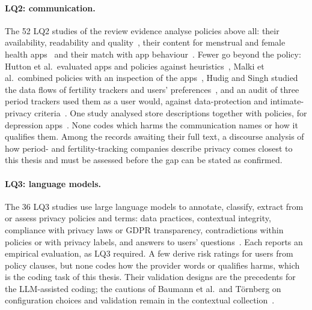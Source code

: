\paragraph{LQ2: communication.} The 52 LQ2 studies of the review evidence
analyse policies above all: their availability, readability and
quality~\parencite{sunyaev2015availability,robillard2019availability,oloughlin2019reviewing},
their content for menstrual and female health apps~\parencite{shipp2020period,malki2024exploring}
and their match with app behaviour~\parencite{huckvale2019assessment,tangari2021mobile}.
Fewer go beyond the policy: Hutton et al.\ evaluated apps and policies against
heuristics~\parencite{hutton2018assessing}, Malki et al.\ combined policies
with an inspection of the apps~\parencite{malki2024exploring}, Hudig and
Singh studied the data flows of fertility trackers and users'
preferences~\parencite{hudig2025intimate}, and an audit of three period trackers
used them as a user would, against data-protection and intimate-privacy
criteria~\parencite{white2026experiential}. One study analysed store
descriptions together with policies, for depression
apps~\parencite{singh2023assessment}. None codes which harms the communication
names or how it qualifies them. Among the records awaiting their full text, a
discourse analysis of how period- and fertility-tracking companies describe
privacy comes closest to this thesis and must be assessed before the gap can be
stated as confirmed.

\paragraph{LQ3: language models.} The 36 LQ3 studies use large language models
to annotate, classify, extract from or assess privacy policies and terms: data
practices, contextual integrity, compliance with privacy laws or GDPR
transparency, contradictions within policies or with privacy labels, and
answers to users' questions~\parencite{rodriguez2024llm,chanenson2025automating,xie2025evaluating}.
Each reports an empirical evaluation, as LQ3 required. A few derive risk ratings
for users from policy clauses, but none codes how the provider words or
qualifies harms, which is the coding task of this thesis. Their validation
designs are the precedents for the LLM-assisted coding; the cautions of Baumann
et al.\ and Törnberg on configuration choices and validation remain in the
contextual collection~\parencite{baumann2025llm,tornberg2024best}.

